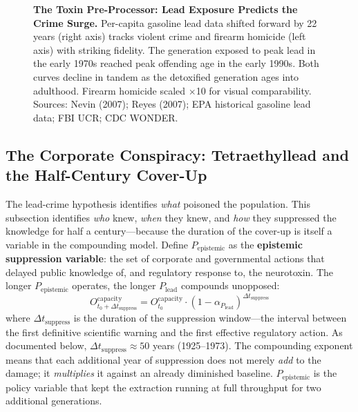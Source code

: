 \documentclass[12pt,openany]{book}
\begin{document}
\begin{figure}[htbp]
\caption{\textbf{The Toxin Pre-Processor: Lead Exposure Predicts the Crime Surge.} Per-capita gasoline lead data shifted forward by 22 years (right axis) tracks violent crime and firearm homicide (left axis) with striking fidelity. The generation exposed to peak lead in the early 1970s reached peak offending age in the early 1990s. Both curves decline in tandem as the detoxified generation ages into adulthood. Firearm homicide scaled $\times$10 for visual comparability. Sources: Nevin (2007); Reyes (2007); EPA historical gasoline lead data; FBI UCR; CDC WONDER.}
\label{fig:lead_crime}
\end{figure}

\subsection{The Corporate Conspiracy: Tetraethyllead and the Half-Century Cover-Up}

The lead-crime hypothesis identifies \textit{what} poisoned the population. This subsection identifies \textit{who} knew, \textit{when} they knew, and \textit{how} they suppressed the knowledge for half a century---because the duration of the cover-up is itself a variable in the compounding model. Define $P_{\text{epistemic}}$ as the \textbf{epistemic suppression variable}: the set of corporate and governmental actions that delayed public knowledge of, and regulatory response to, the neurotoxin. The longer $P_{\text{epistemic}}$ operates, the longer $P_{\text{lead}}$ compounds unopposed:
\[
O_{t_0 + \Delta t_{\text{suppress}}}^{\text{capacity}} = O_{t_0}^{\text{capacity}} \cdot (1 - \alpha_{P_{\text{lead}}})^{\Delta t_{\text{suppress}}}
\]
where $\Delta t_{\text{suppress}}$ is the duration of the suppression window---the interval between the first definitive scientific warning and the first effective regulatory action. As documented below, $\Delta t_{\text{suppress}} \approx 50$ years (1925--1973). The compounding exponent means that each additional year of suppression does not merely \textit{add} to the damage; it \textit{multiplies} it against an already diminished baseline. $P_{\text{epistemic}}$ is the policy variable that kept the extraction running at full throughput for two additional generations.
\end{document}
